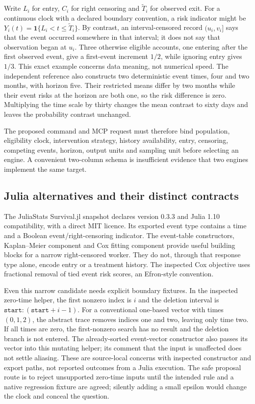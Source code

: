 Write $L_i$ for entry, $C_i$ for right censoring and $\widetilde T_i$ for observed exit.
For a continuous clock with a declared boundary convention, a risk indicator might be
$Y_i(t)=\mathbf1\{L_i<t\leq\widetilde T_i\}$. By contrast, an interval-censored
record $(u_i,v_i]$ says that the event occurred somewhere in that interval; it does not
say that observation began at $u_i$. Three otherwise eligible accounts, one entering
after the first observed event, give a first-event increment $1/2$, while ignoring
entry gives $1/3$. This exact example concerns data meaning, not numerical speed.
The independent reference also constructs two deterministic event times, four and
two months, with horizon five. Their restricted means differ by two months while
their event risks at the horizon are both one, so the risk difference is zero.
Multiplying the time scale by thirty changes the mean contrast to sixty days and
leaves the probability contrast unchanged.\citep{exec24_survivalother_reference}

The proposed command and MCP request must therefore bind population, eligibility
clock, intervention strategy, history availability, entry, censoring, competing events,
horizon, output units and sampling unit before selecting an engine. A convenient
two-column schema is insufficient evidence that two engines implement the same target.

\subsection{Julia alternatives and their distinct contracts}
The JuliaStats Survival.jl snapshot declares version 0.3.3 and Julia 1.10 compatibility,
with a direct MIT licence. Its exported event type contains a time and a Boolean
event/right-censoring indicator. The event-table constructors, Kaplan--Meier component
and Cox fitting component provide useful building blocks for a narrow right-censored
worker. They do not, through that response type alone, encode entry or a treatment
history. The inspected Cox objective uses fractional removal of tied event risk
scores, an Efron-style convention.\citep{exec24_survivalother_juliastats}

Even this narrow candidate needs explicit boundary fixtures. In the inspected
zero-time helper, the first nonzero index is $i$ and the deletion interval is
$\texttt{start}:(\texttt{start}+i-1)$. For a conventional one-based vector
with times $(0,1,2)$, the abstract trace removes indices one and two, leaving only
time two. If all times are zero, the first-nonzero search has no result and the
deletion branch is not entered. The already-sorted event-vector constructor also
passes its vector into this mutating helper; its comment that the input is unaffected
does not settle aliasing. These are source-local concerns with inspected constructor
and export paths, not reported outcomes from a Julia execution. The safe proposal
route is to reject unsupported zero-time inputs until the intended rule and a native
regression fixture are agreed; silently adding a small epsilon would change the
clock and conceal the question.\citep{exec24_survivalother_juliastats,exec24_survivalother_reference}

